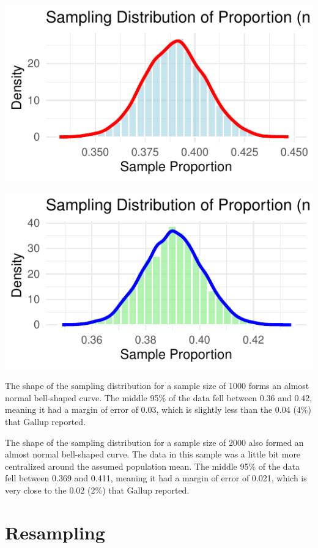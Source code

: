 \documentclass{article}\usepackage[]{graphicx}\usepackage[]{xcolor}
\makeatletter
\def\maxwidth{ %
  \ifdim\Gin@nat@width>\linewidth
    \linewidth
  \else
    \Gin@nat@width
  \fi
}
\newenvironment{knitrout}{}{} %
\makeatother
\begin{document}
\begin{multicols}{2}
\begin{knitrout}
\color{fgcolor}
\includegraphics[width=\maxwidth]{figure/unnamed-chunk-1-1} 

\includegraphics[width=\maxwidth]{figure/unnamed-chunk-1-2} 
\end{knitrout}

The shape of the sampling distribution for a sample size of 1000 forms an almost normal bell-shaped curve. The middle 95\% of the data fell between 0.36 and 0.42, meaning it had a margin of error of 0.03, which is slightly less than the 0.04 (4\%) that Gallup reported.

The shape of the sampling distribution for a sample size of 2000 also formed an almost normal bell-shaped curve. The data in this sample was a little bit more centralized around the assumed population mean. The middle 95\% of the data fell between 0.369 and 0.411, meaning it had a margin of error of 0.021, which is very close to the 0.02 (2\%) that Gallup reported.

\section{Resampling}


\end{multicols}
\end{document}

